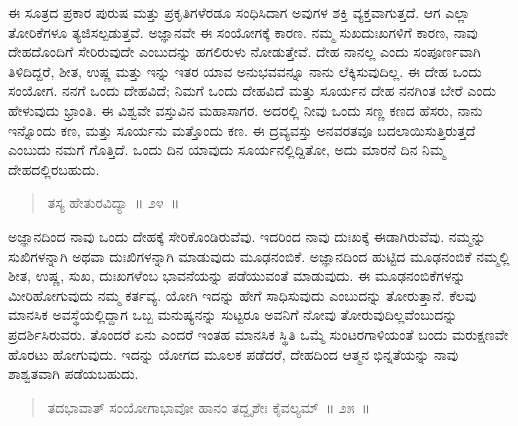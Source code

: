 \vspace{0.2cm}

ಈ ಸೂತ್ರದ ಪ್ರಕಾರ ಪುರುಷ ಮತ್ತು ಪ್ರಕೃತಿಗಳೆರಡೂ ಸಂಧಿಸಿದಾಗ ಅವುಗಳ ಶಕ್ತಿ ವ್ಯಕ್ತವಾಗುತ್ತದೆ. ಆಗ ಎಲ್ಲಾ ತೋರಿಕೆಗಳೂ ತ್ಯಜಿಸಲ್ಪಡುತ್ತವೆ. ಅಜ್ಞಾನವೇ ಈ ಸಂಯೋಗಕ್ಕೆ ಕಾರಣ. ನಮ್ಮ ಸುಖದುಃಖಗಳಿಗೆ ಕಾರಣ, ನಾವು ದೇಹದೊಂದಿಗೆ ಸೇರಿರುವುದೇ ಎಂಬುದನ್ನು ಹಗಲಿರುಳು ನೋಡುತ್ತೇವೆ. ದೇಹ ನಾನಲ್ಲ ಎಂದು ಸಂಪೂರ್ಣವಾಗಿ ತಿಳಿದಿದ್ದರೆ, ಶೀತ, ಉಷ್ಣ ಮತ್ತು ಇನ್ನು ಇತರ ಯಾವ ಅನುಭವವನ್ನೂ ನಾನು ಲೆಕ್ಕಿಸುವುದಿಲ್ಲ. ಈ ದೇಹ ಒಂದು ಸಂಯೋಗ. ನನಗೆ ಒಂದು ದೇಹವಿದೆ; ನಿಮಗೆ ಒಂದು ದೇಹವಿದೆ ಮತ್ತು ಸೂರ್ಯನ ದೇಹ ನನಗಿಂತ ಬೇರೆ ಎಂದು ಹೇಳುವುದು ಭ್ರಾಂತಿ. ಈ ವಿಶ್ವವೇ ವಸ್ತುವಿನ ಮಹಾಸಾಗರ. ಅದರಲ್ಲಿ ನೀವು ಒಂದು ಸಣ್ಣ ಕಣದ ಹೆಸರು, ನಾನು ಇನ್ನೊಂದು ಕಣ, ಮತ್ತು ಸೂರ್ಯನು ಮತ್ತೊಂದು ಕಣ. ಈ ದ್ರವ್ಯವಸ್ತು ಅನವರತವೂ ಬದಲಾಯಿಸು\break ತ್ತಿರುತ್ತದೆ ಎಂಬುದು ನಮಗೆ ಗೊತ್ತಿದೆ. ಒಂದು ದಿನ ಯಾವುದು ಸೂರ್ಯನಲ್ಲಿದ್ದಿತೋ, ಅದು ಮಾರನೆ ದಿನ ನಿಮ್ಮ ದೇಹದಲ್ಲಿರಬಹುದು. 

\vspace{-0.2cm}

\begin{verse}
ತಸ್ಯ ಹೇತುರವಿದ್ಯಾ~॥ ೨೪~॥
\end{verse}

\vspace{-0.4cm}


\vspace{0.2cm}

ಅಜ್ಞಾನದಿಂದ ನಾವು ಒಂದು ದೇಹಕ್ಕೆ ಸೇರಿಕೊಂಡಿರುವೆವು. ಇದರಿಂದ ನಾವು ದುಃಖಕ್ಕೆ ಈಡಾಗಿರುವೆವು. ನಮ್ಮನ್ನು ಸುಖಿಗಳನ್ನಾಗಿ ಅಥವಾ ದುಃಖಿಗಳನ್ನಾಗಿ ಮಾಡುವುದು ಮೂಢನಂಬಿಕೆ. ಅಜ್ಞಾನದಿಂದ ಹುಟ್ಟಿದ ಮೂಢನಂಬಿಕೆ ನಮ್ಮಲ್ಲಿ ಶೀತ, ಉಷ್ಣ, ಸುಖ, ದುಃಖಗಳೆಂಬ ಭಾವನೆಯನ್ನು ಪಡೆಯುವಂತೆ ಮಾಡುವುದು. ಈ ಮೂಢನಂಬಿಕೆಗಳನ್ನು ಮೀರಿಹೋಗುವುದು ನಮ್ಮ ಕರ್ತವ್ಯ. ಯೋಗಿ ಇದನ್ನು ಹೇಗೆ ಸಾಧಿಸುವುದು ಎಂಬುದನ್ನು ತೋರುತ್ತಾನೆ. ಕೆಲವು ಮಾನಸಿಕ ಅವಸ್ಥೆಯಲ್ಲಿದ್ದಾಗ ಒಬ್ಬ ಮನುಷ್ಯನನ್ನು ಸುಟ್ಟರೂ ಅವನಿಗೆ ನೋವು ತೋರುವುದಿಲ್ಲವೆಂಬುದನ್ನು ಪ್ರದರ್ಶಿಸಿರುವರು. ತೊಂದರೆ ಏನು ಎಂದರೆ ಇಂತಹ ಮಾನಸಿಕ ಸ್ಥಿತಿ ಒಮ್ಮೆ ಸುಂಟರಗಾಳಿಯಂತೆ ಬಂದು ಮರುಕ್ಷಣವೇ ಹೊರಟು ಹೋಗುವುದು. ಇದನ್ನು ಯೋಗದ ಮೂಲಕ ಪಡೆದರೆ, ದೇಹದಿಂದ ಆತ್ಮನ ಭಿನ್ನತೆಯನ್ನು ನಾವು ಶಾಶ್ವತವಾಗಿ ಪಡೆಯಬಹುದು. 

\vspace{-0.2cm}

\begin{verse}
ತದಭಾವಾತ್​ ಸಂಯೋಗಾಭಾವೋ ಹಾನಂ ತದ್ದೃಶೇಃ ಕೈವಲ್ಯಮ್​~॥ ೨೫~॥
\end{verse}

\vspace{-0.45cm}



\vskip 0.2cm

